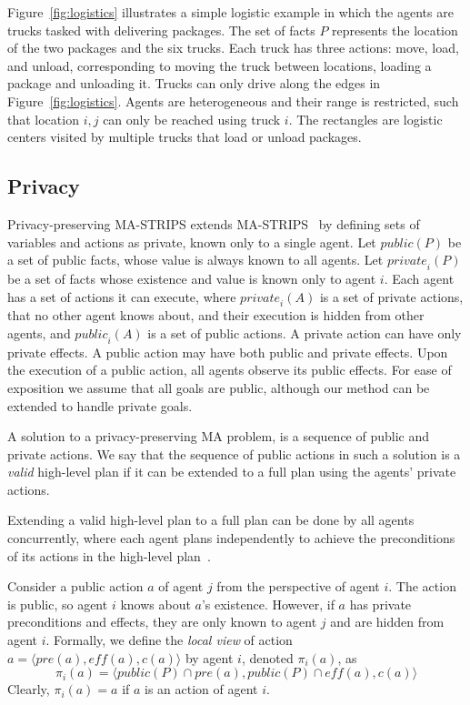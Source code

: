 \documentclass[letterpaper]{article}
\newcommand{\private}[2]{\textit{private}_{#1}(#2)}
\newcommand{\eff}{\textit{eff}}
\newcommand{\pre}{\textit{pre}}
\newcommand{\public}{\textit{public}}
\theoremstyle{definition}
\begin{document}
Figure~\ref{fig:logistics} illustrates a simple logistic example in which the agents are trucks tasked with delivering packages. %
The set of facts $P$ represents the location of the two packages and the six trucks. Each truck has three actions: move, load, and unload, corresponding to moving the truck between locations, loading a package and unloading it. Trucks can only drive along the edges in Figure~\ref{fig:logistics}. Agents are heterogeneous  and their range is restricted, such that location $i,j$ can only be reached using truck $i$. The rectangles are logistic centers visited by multiple trucks that load or unload packages.

\subsection{Privacy}

Privacy-preserving MA-STRIPS extends MA-STRIPS~\cite{brafman2008one} by defining sets of variables and actions as private, known only to a single agent. Let $\public(P)$ be a set of public facts, whose value is always known to all agents. Let $\private{i}{P}$ be a set of facts whose existence and value is known only to agent $i$. Each agent has a set of actions it can execute, where $\private{i}{A}$ is a set of private actions, that no other agent knows about, and their execution is hidden from other agents, and $\public_i(A)$ is a set of public actions. A private action can have only private effects. A public action may have both public and private effects. Upon the execution of a public action, all agents observe its public effects. For ease of exposition we assume that all goals are public, although our method can be extended to handle private goals.

A solution to a privacy-preserving MA problem, is a sequence of public and private actions. We say that the sequence of public actions in such a solution is a {\em valid} high-level plan if it can be extended to a full plan using the agents' private actions.

Extending a valid high-level plan to a full plan can be done by all agents concurrently, where each agent plans independently to achieve the preconditions of its actions in the high-level plan~\cite{maliah2014privacyPreserving}.

Consider a public action $a$ of agent $j$ from the perspective of agent $i$.
The action is public, so agent $i$ knows about $a$'s existence. However, if $a$ has private preconditions and effects, they are only known to agent $j$ and are hidden from agent $i$. Formally, we define the {\em local view} of action $a=\langle \pre(a),\eff(a),c(a) \rangle$ by agent $i$, denoted $\pi_i(a)$, as
\[ \pi_i(a)=\langle \public(P)\cap \pre(a), \public(P)\cap \eff(a), c(a) \rangle \]
Clearly, $\pi_i(a)=a$ if $a$ is an action of agent $i$.
\end{document}
